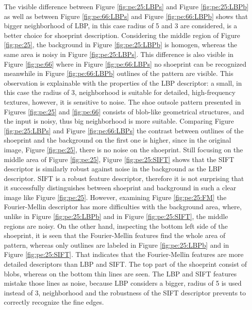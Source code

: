 \documentclass[draft,final]{vutinfth} %
\begin{document}
\par
The visible difference between Figure \ref{fig:pe:25:LBPs} and Figure \ref{fig:pe:25:LBPb} as well as between Figure \ref{fig:pe:66:LBPs} and Figure \ref{fig:pe:66:LBPb} shows that bigger neighborhood of LBP, in this case radius of 5 and 3 are considered, is a better choice for shoeprint description.
Considering the middle region of Figure \ref{fig:pe:25}, the background in Figure \ref{fig:pe:25:LBPb} is homogen, whereas the same area is noisy in Figure \ref{fig:pe:25:LBPs}.
This difference is also visible in  Figure \ref{fig:pe:66} where in Figure \ref{fig:pe:66:LBPs} no shoeprint can be recognized meanwhile in Figure \ref{fig:pe:66:LBPb} outlines of the pattern are visible.
This observation is explainable with the properties of the LBP descriptor: a small, in this case the radius of 3, neighborhood is suitable for detailed, high-frequency textures, however, it is sensitive to noise.
The shoe outsole pattern presented in Figures \ref{fig:pe:25}  and \ref{fig:pe:66} consists of blob-like geometrical structures, and the input is noisy, thus big neighborhood is more suitable.
Comparing Figure \ref{fig:pe:25:LBPs} and Figure \ref{fig:pe:66:LBPs} the contrast between outlines of the shoeprint and the background on the first one is higher, since in the original image, Figure \ref{fig:pe:25}, there is no noise on the shoeprint.
Still focusing on the middle area of Figure \ref{fig:pe:25}, Figure \ref{fig:pe:25:SIFT} shows that the SIFT descriptor is similarly robust against noise in the background as the LBP descriptor.
SIFT is a robust feature descriptor, therefore it is not surprising that it successfully distinguishes between shoeprint and background in such a clear image like Figure \ref{fig:pe:25}.
However, examining Figure  \ref{fig:pe:25:FM} the Fourier-Mellin descriptor has more difficulties with the background area, where,   unlike in  Figure \ref{fig:pe:25:LBPb} and in Figure \ref{fig:pe:25:SIFT}, the middle regions are noisy.
On the other hand, inspecting the bottom left side of the shoeprint, it is seen that the Fourier-Mellin features find the whole area of pattern, whereas only outlines are labeled in Figure \ref{fig:pe:25:LBPb} and in Figure \ref{fig:pe:25:SIFT}.
That indicates that the Fourier-Mellin features are more detailed descriptors than LBP and SIFT. 
The top part of the shoeprint consist of blobs, whereas on the bottom thin lines are seen.
The LBP and SIFT features mistake those lines as noise, because LBP considers a bigger, radius of 5 is used instead of 3, neighborhood and the robustness of the SIFT descriptor prevents to correctly recognize the fine edges.
\end{document}
